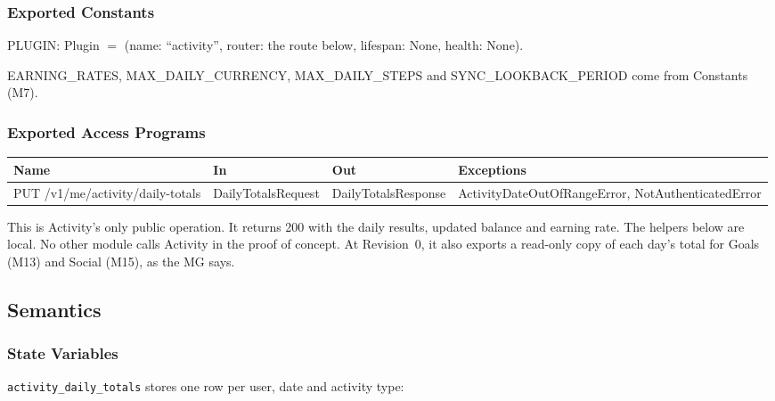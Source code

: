 \documentclass[12pt, titlepage]{article}
\begin{document}
\subsubsection{Exported Constants}

\noindent PLUGIN: Plugin $=$ (name: ``activity'', router: the route below,
lifespan: None, health: None).

\medskip
{\raggedright\noindent EARNING\_RATES, MAX\_DAILY\_CURRENCY,
MAX\_DAILY\_STEPS and SYNC\_LOOKBACK\_PERIOD come from Constants (M7).\par}

\subsubsection{Exported Access Programs}

\begin{center}
\footnotesize
\setlength{\tabcolsep}{3pt}
\begin{tabular}{>{\raggedright\arraybackslash}p{3.5cm}
  >{\raggedright\arraybackslash}p{3.2cm}
  >{\raggedright\arraybackslash}p{3.4cm}
  >{\raggedright\arraybackslash}p{5.1cm}}
\toprule
\textbf{Name} & \textbf{In} & \textbf{Out} & \textbf{Exceptions} \\
\midrule
PUT /v1/me/activity/\allowbreak daily-totals & DailyTotalsRequest &
DailyTotalsResponse & ActivityDateOutOfRangeError, NotAuthenticatedError \\
\bottomrule
\end{tabular}
\end{center}

\noindent This is Activity's only public operation. It returns 200 with the
daily results, updated balance and earning rate. The helpers below are local.
No other module calls Activity in the proof of concept. At Revision~0, it also
exports a read-only copy of each day's total for Goals (M13) and Social (M15),
as the MG says.

\subsection{Semantics}

\subsubsection{State Variables}

\noindent \texttt{activity\_daily\_totals} stores one row per user, date and activity type:
\end{document}
